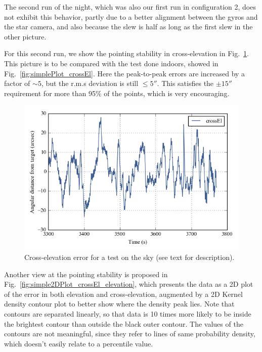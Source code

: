 The second run of the night, which was also our first run in configuration 2, does not exhibit this behavior, partly due to a better alignment between the gyros and the star camera, and also because the slew is half as long as the first slew in the other picture. 

For this second run, we show the pointing stability in cross-elevation in Fig.~\ref{fig:crossEl_outside}. This picture is to be compared with the test done indoors, showed in Fig.~\ref{fig:simplePlot_crossEl}. Here the peak-to-peak errors are increased by a factor of $\sim 5$, but the r.m.s deviation is still $\le\ang{;;5}$. This satisfies the $\pm\ang{;;15}$ requirement for more than 95\% of the points, which is very encouraging.
\begin{figure}[!h]
\begin{center}
\includegraphics{Figures/crossEl_outside.png}
\vspace{-0.5cm}
\caption[Cross-elevation error]{Cross-elevation error for a test on the sky (see text for description).}
\label{fig:crossEl_outside}
\end{center}
\end{figure}

Another view at the pointing stability is proposed in Fig.~\ref{fig:simple2DPlot_crossEl_elevation}, which presents the data as a 2D plot of the error in both elevation and cross-elevation, augmented by a 2D Kernel density contour plot to better show where the density peak lies. Note that contours are separated linearly, so that data is 10 times more likely to be inside the brightest contour than outside the black outer contour. The values of the contours are not meaningful, since they refer to lines of same probability density, which doesn't easily relate to a percentile value. 

